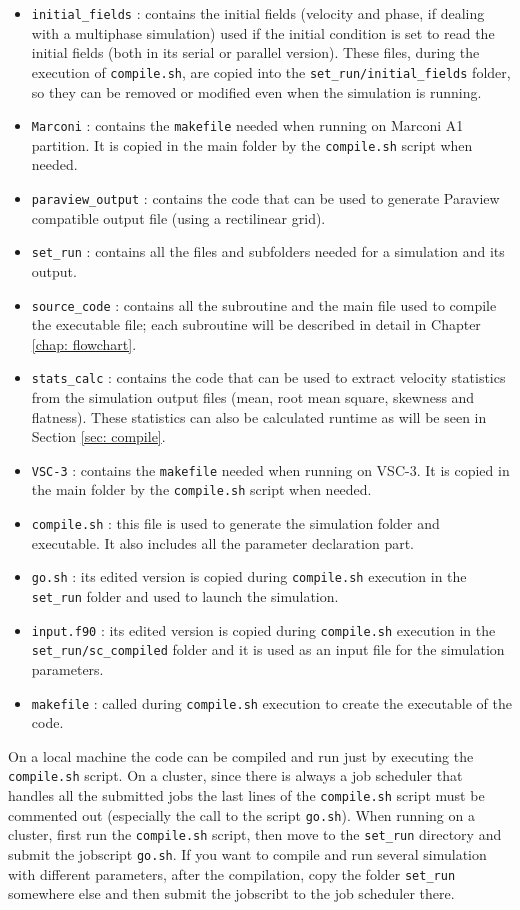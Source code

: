 \begin{itemize}
\item \texttt{initial\_fields} : contains the initial fields (velocity and phase, if dealing with a multiphase simulation) used if the initial condition is set to read the initial fields (both in its serial or parallel version). These files, during the execution of \texttt{compile.sh}, are copied into the \texttt{set\_run/initial\_fields} folder, so they can be removed or modified even when the simulation is running.
\item \texttt{Marconi} : contains the \texttt{makefile} needed when running on Marconi A1 partition. It is copied in the main folder by the \texttt{compile.sh} script when needed.
\item \texttt{paraview\_output} : contains the code that can be used to generate Paraview compatible output file (using a rectilinear grid).
\item \texttt{set\_run} : contains all the files and subfolders needed for a simulation and its output.
\item \texttt{source\_code} : contains all the subroutine and the main file used to compile the executable file; each subroutine will be described in detail in Chapter \ref{chap: flowchart}.
\item \texttt{stats\_calc} : contains the code that can be used to extract velocity statistics from the simulation output files (mean, root mean square, skewness and flatness). These statistics can also be calculated runtime as will be seen in Section \ref{sec: compile}.
\item \texttt{VSC-3} : contains the \texttt{makefile} needed when running on VSC-3. It is copied in the main folder by the \texttt{compile.sh} script when needed.
\item \texttt{compile.sh} : this file is used to generate the simulation folder and executable. It also includes all the parameter declaration part.
\item \texttt{go.sh} : its edited version is copied during \texttt{compile.sh} execution in the \texttt{set\_run} folder and used to launch the simulation.
\item \texttt{input.f90} : its edited version is copied during \texttt{compile.sh} execution in the \texttt{set\_run/sc\_compiled} folder and it is used as an input file for the simulation parameters.
\item \texttt{makefile} : called during \texttt{compile.sh} execution to create the executable of the code.
\end{itemize}
On a local machine the code can be compiled and run just by executing the \texttt{compile.sh} script. On a cluster, since there is always a job scheduler that handles all the submitted jobs the last lines of the \texttt{compile.sh} script must be commented out (especially the call to the script \texttt{go.sh}). When running on a cluster, first run the \texttt{compile.sh} script, then move to the \texttt{set\_run} directory and submit the jobscript \texttt{go.sh}. If you want to compile and run several simulation with different parameters, after the compilation, copy the folder \texttt{set\_run} somewhere else and then submit the jobscribt to the job scheduler there.\\

